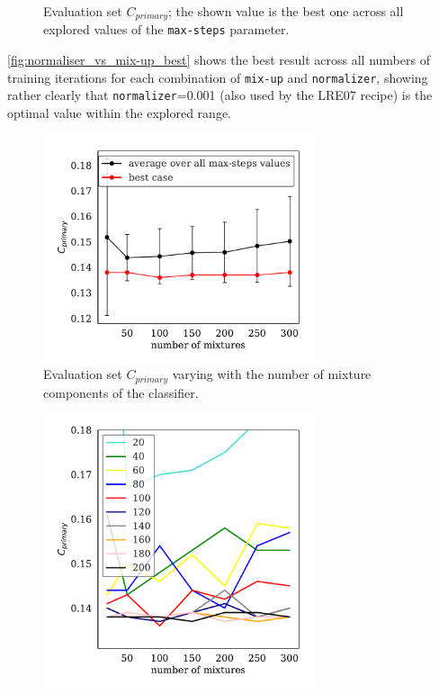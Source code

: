 \documentclass[bsc,frontabs,twoside,singlespacing,parskip,deptreport]{infthesis}
\begin{document}
{{\begin{figure}[h!t]
      \vspace*{-1em}
      \caption{Evaluation set $C_{primary}$; the shown value is the best one across all explored values of the \texttt{max-steps} parameter.}
      \label{fig:normaliser_vs_mix-up_best}
    \end{figure}
    \autoref{fig:normaliser_vs_mix-up_best} shows the best result across all numbers of training iterations for each combination of \verb|mix-up| and \verb|normalizer|, showing rather clearly that \verb|normalizer|=0.001 (also used by the LRE07 recipe) is the optimal value within the explored range.
    \begin{figure}[h!t]
      \centering
      \includegraphics[width=8cm]{../img/logit_mix-up.pdf}
      \vspace*{-1em}
      \caption{Evaluation set $C_{primary}$ varying with the number of mixture components of the classifier.}
      \label{fig:logit_mix-up}
    \end{figure}
    \begin{figure}[h!t]
      \centering
      \includegraphics[width=8cm]{../img/logit_max-steps_vs_mix-up.pdf}
      \vspace*{-1em}

\end{figure}}}
\end{document}
